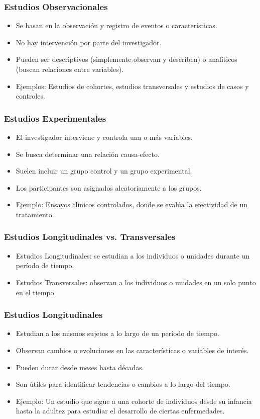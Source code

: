 \documentclass[aspectratio=169]{beamer}
\begin{document}
\begin{frame}
\frametitle{Estudios Observacionales}
\begin{itemize}
    \item Se basan en la observación y registro de eventos o características.
    \item No hay intervención por parte del investigador.
    \item Pueden ser descriptivos (simplemente observan y describen) o analíticos (buscan relaciones entre variables).
    \item Ejemplos: Estudios de cohortes, estudios transversales y estudios de casos y controles.
\end{itemize}
\end{frame}

\begin{frame}
\frametitle{Estudios Experimentales}
\begin{itemize}
    \item El investigador interviene y controla una o más variables.
    \item Se busca determinar una relación causa-efecto.
    \item Suelen incluir un grupo control y un grupo experimental.
    \item Los participantes son asignados aleatoriamente a los grupos.
    \item Ejemplo: Ensayos clínicos controlados, donde se evalúa la efectividad de un tratamiento.
\end{itemize}
\end{frame}


\begin{frame}
\frametitle{Estudios Longitudinales vs. Transversales}
\begin{itemize}
    \item Estudios Longitudinales: se estudian a los individuos o unidades durante un período de tiempo.
    \item Estudios Transversales: observan a los individuos o unidades en un solo punto en el tiempo.
\end{itemize}
\end{frame}


\begin{frame}
\frametitle{Estudios Longitudinales}
\begin{itemize}
    \item Estudian a los mismos sujetos a lo largo de un período de tiempo.
    \item Observan cambios o evoluciones en las características o variables de interés.
    \item Pueden durar desde meses hasta décadas.
    \item Son útiles para identificar tendencias o cambios a lo largo del tiempo.
    \item Ejemplo: Un estudio que sigue a una cohorte de individuos desde su infancia hasta la adultez para estudiar el desarrollo de ciertas enfermedades.
\end{itemize}
\end{frame}
\end{document}
